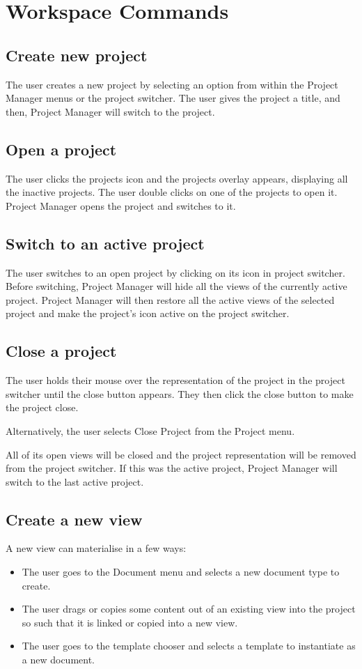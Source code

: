 \documentclass[11pt]{report}
\newcommand{\proman}{Project Manager\xspace}
\begin{document}
\section{Workspace Commands}

\subsection{Create new project}
The user creates a new project by selecting an option from within the \proman menus or the project switcher. The user gives the project a title, and then, \proman will switch to the project.

\subsection{Open a project}
The user clicks the projects icon and the projects overlay appears, displaying all the inactive projects. The user double clicks on one of the projects to open it. \proman opens the project and switches to it.

\subsection{Switch to an active project}
The user switches to an open project by clicking on its icon in project switcher. Before switching, \proman will hide all the views of the currently active project. \proman will then restore all the active views of the selected project and make the project's icon active on the project switcher.

\subsection{Close a project}
The user holds their mouse over the representation of the project in the project switcher until the close button appears. They then click the close button to make the project close.

Alternatively, the user selects Close Project from the Project menu.

All of its open views will be closed and the project representation will be removed from the project switcher. If this was the active project, \proman will switch to the last active project.

\subsection{Create a new view}
A new view can materialise in a few ways:
\begin{itemize}
\item The user goes to the Document menu and selects a new document type to create.
\item The user drags or copies some content out of an existing view into the project so such that it is linked or copied into a new view.
\item The user goes to the template chooser and selects a template to instantiate as a new document.
\end{itemize}
\end{document}
